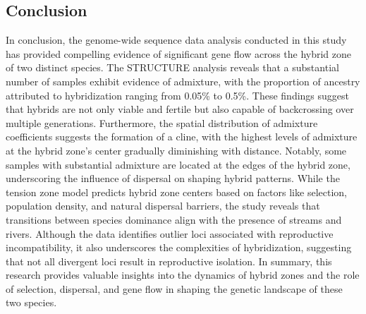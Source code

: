 \subsection{Conclusion}

In conclusion, the genome-wide sequence data analysis conducted in this study 
has provided compelling evidence of significant gene flow across the hybrid zone 
of two distinct species. The STRUCTURE analysis reveals that a substantial 
number of samples exhibit evidence of admixture, with the proportion of ancestry 
attributed to hybridization ranging from 0.05\% to 0.5\%. These findings suggest 
that hybrids are not only viable and fertile but also capable of backcrossing 
over multiple generations. Furthermore, the spatial distribution of admixture 
coefficients suggests the formation of a cline, with the highest levels of 
admixture at the hybrid zone's center gradually diminishing with distance. 
Notably, some samples with substantial admixture are located at the edges of the 
hybrid zone, underscoring the influence of dispersal on shaping hybrid patterns.
 While the tension zone model predicts hybrid zone centers based on factors like 
 selection, population density, and natural dispersal barriers, the study reveals 
 that transitions between species dominance align with the presence of streams 
 and rivers. Although the data identifies outlier loci associated with reproductive
 incompatibility, it also underscores the complexities of hybridization, suggesting 
 that not all divergent loci result in reproductive isolation. In summary, this 
 research provides valuable insights into the dynamics of hybrid zones and the 
 role of selection, dispersal, and gene flow in shaping the genetic landscape 
 of these two species.

